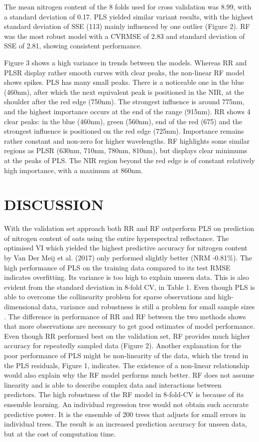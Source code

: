 \documentclass{isprs}
\begin{document}
The mean nitrogen content of the 8 folds used for cross validation was 8.99, with a standard deviation of 0.17. PLS yielded similar variant results, with the highest standard deviation of SSE (113) mainly influenced by one outlier (Figure 2). RF was the most robust model with a CVRMSE of 2.83 and standard deviation of SSE of 2.81, showing consistent performance. 

Figure 3 shows a high variance in trends between the models. Whereas RR and PLSR display rather smooth curves with clear peaks, the non-linear RF model shows spikes. PLS has many small peaks. There is a noticeable one in the blue (460nm), after which the next equivalent peak is positioned in the NIR, at the shoulder after the red edge (750nm). The strongest influence is around 775nm, and the highest importance occurs at the end of the range (915nm). RR shows 4 clear peaks: in the blue (460nm), green (560nm), end of the red (675) and the strongest influence is positioned on the red edge (725nm). Importance remains rather constant and non-zero for higher wavelengths. RF highlights some similar regions as PLSR (630nm, 710nm, 780nm, 810nm), but displays clear minimums at the peaks of PLS. The NIR region beyond the red edge is of constant relatively high importance, with a maximum at 860nm.
 



\section{DISCUSSION}

With the validation set approach both RR and RF outperform PLS on prediction of nitrogen content of oats using the entire hyperspectral reflectance. The optimised VI which yielded the highest predictive accuracy for nitrogen content by Van Der Meij et al. (2017) only performed slightly better (NRM -0.81\%). The high performance of PLS on the training data compared to its test RMSE indicates overfitting. Its variance is too high to explain unseen data. This is also evident from the standard deviation in 8-fold CV, in Table 1. Even though PLS is able to overcome the collinearity problem for sparse observations and high-dimensional data, variance and robustness is still a problem for small sample sizes \cite{Chung2010,Ji2015}. The difference in performance of RR and RF between the two methods shows that more observations are necessary to get good estimates of model performance. Even though RR performed best on the validation set, RF provides much higher accuracy for repeatedly sampled data (Figure 2). Another explanation for the poor performance of PLS might be non-linearity of the data, which the trend in the PLS residuals, Figure 1, indicates. The existence of a non-linear relationship would also explain why the RF model performs much better. RF does not assume linearity and is able to describe complex data and interactions between predictors. The high robustness of the RF model in 8-fold-CV is because of its ensemble learning. An individual regression tree would not obtain such accurate predictive power. It is the ensemble of 200 trees that adjusts for small errors in individual trees. The result is an increased prediction accuracy for unseen data, but at the cost of computation time.
\end{document}
